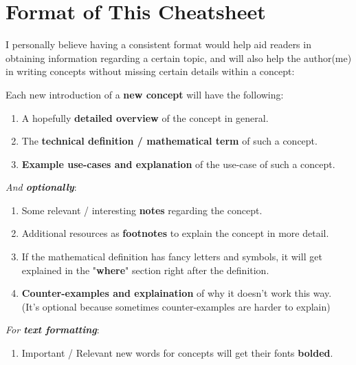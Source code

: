\chapter{Format of This Cheatsheet}

I personally believe having a consistent format would help aid readers
in obtaining information regarding a certain topic, and will also help the author(me)
in writing concepts without missing certain details within a concept:

\vspace{3em}

Each new introduction of a \textbf{new concept} will have the following:
\begin{enumerate}
    \item A hopefully \textbf{detailed overview} of the concept in general.
    \item The \textbf{technical definition / mathematical term} of such a concept.
    \item \textbf{Example use-cases and explanation} of the use-case of such a concept.
\end{enumerate}

\tgap

\emph{And \textbf{optionally}}:
\begin{enumerate}
    \item Some relevant / interesting \textbf{notes} regarding the concept.
    \item Additional resources as \textbf{footnotes} to explain the concept in more detail.
    \item If the mathematical definition has fancy letters and symbols, it will get explained
        in the "\textbf{where}" section right after the definition.
    \item \textbf{Counter-examples and explaination} of why it doesn't work this way.
        (It's optional because sometimes counter-examples are harder to explain)
\end{enumerate}

\tgap

\emph{For \textbf{text formatting}}:
\begin{enumerate}
    \item Important / Relevant new words for concepts will get their fonts \textbf{bolded}.
\end{enumerate}



